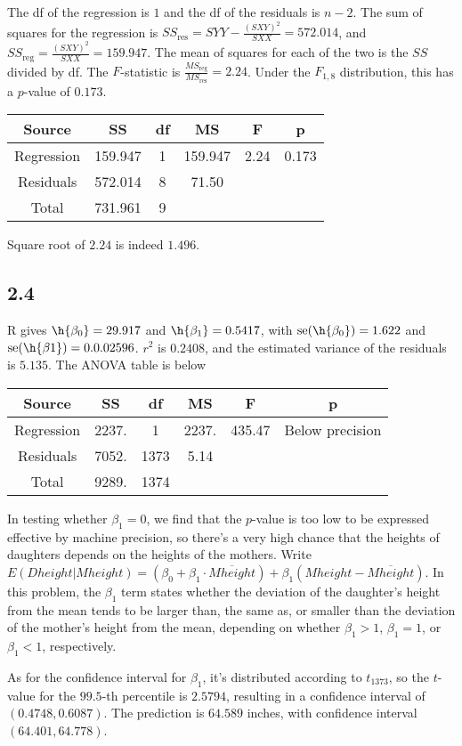 \documentclass{article}
\newcommand{\conj}{\overline}
\DeclareMathOperator{\se}{se}
\begin{document}
The df of the regression is $1$ and the df of the residuals is $n-2$. The sum of squares for the regression is $SS_\text{res}=SYY-\frac{(SXY)^2}{SXX}=572.014$, and $SS_\text{reg}=\frac{(SXY)^2}{SXX}=159.947$. The mean of squares for each of the two is the $SS$ divided by df. The $F$-statistic is $\frac{MS_\text{reg}}{MS_\text{res}}=2.24$. Under the $F_{1,8}$ distribution, this has a $p$-value of $0.173$.

\begin{tabular}{cccccc}
\hline
Source & SS & df & MS & F & p\\
\hline
Regression & 159.947 & 1 & 159.947 & 2.24 & 0.173\\
Residuals & 572.014 & 8 & 71.50 \\
Total & 731.961& 9\\
\end{tabular}

Square root of $2.24$ is indeed $1.496$.

\subsection*{2.4}
R gives $\h{\beta_0}=29.917$ and $\h{\beta_1}=0.5417$, with $\se(\h{\beta_0})=1.622$ and $\se(\h{\beta{1}})=0.0.02596$. $r^2$ is $0.2408$, and the estimated variance of the residuals is $5.135$. The ANOVA table is below

\begin{tabular}{cccccc}
\hline
Source & SS & df & MS & F & p\\
\hline
Regression & 2237. & 1 & 2237. & 435.47 & Below precision\\
Residuals & 7052. & 1373 & 5.14 \\
Total &  9289. & 1374\\
\end{tabular}

In testing whether $\beta_1=0$, we find that the $p$-value is too low to be expressed effective by machine precision, so there's a very high chance that the heights of daughters depends on the heights of the mothers.
Write $E(Dheight|Mheight)=(\beta_0+\beta_1\cdot\conj{Mheight})+\beta_1(Mheight-\conj{Mheight})$. In this problem, the $\beta_1$ term states whether the deviation of the daughter's height from the mean tends to be larger than, the same as, or smaller than the deviation of the mother's height from the mean, depending on whether $\beta_1>1$, $\beta_1=1$, or $\beta_1<1$, respectively. 

As for the confidence interval for $\beta_1$, it's distributed according to $t_{1373}$, so the $t$-value for the $99.5$-th percentile is $2.5794$, resulting in a confidence interval of $(0.4748,0.6087)$.
The prediction is $64.589$ inches, with confidence interval $(64.401,64.778)$.
\end{document}
